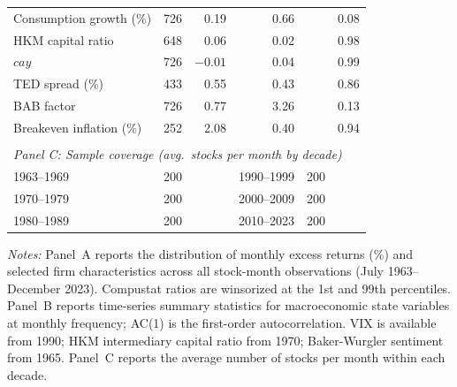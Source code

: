 \begin{table}[H]
\begin{tabular}{lrrrrrr}
Consumption growth (\%) & 726 & 0.19 & 0.66 & & & 0.08 \\
HKM capital ratio & 648 & 0.06 & 0.02 & & & 0.98 \\
$cay$ & 726 & $-0.01$ & 0.04 & & & 0.99 \\
TED spread (\%) & 433 & 0.55 & 0.43 & & & 0.86 \\
BAB factor & 726 & 0.77 & 3.26 & & & 0.13 \\
Breakeven inflation (\%) & 252 & 2.08 & 0.40 & & & 0.94 \\
\\[2pt]
\multicolumn{7}{l}{\textit{Panel C: Sample coverage (avg.\ stocks per month by decade)}} \\
1963--1969 & \multicolumn{2}{l}{200} & 1990--1999 & \multicolumn{2}{l}{200} & \\
1970--1979 & \multicolumn{2}{l}{200} & 2000--2009 & \multicolumn{2}{l}{200} & \\
1980--1989 & \multicolumn{2}{l}{200} & 2010--2023 & \multicolumn{2}{l}{200} & \\
\bottomrule
\end{tabular}
\begin{minipage}{\textwidth}
\vspace{2pt}
\scriptsize{}
\textit{Notes:} Panel~A reports the distribution of monthly excess returns (\%) and selected firm characteristics across all stock-month observations (July 1963--December 2023). Compustat ratios are winsorized at the 1st and 99th percentiles. Panel~B reports time-series summary statistics for macroeconomic state variables at monthly frequency; AC(1) is the first-order autocorrelation. VIX is available from 1990; HKM intermediary capital ratio from 1970; Baker-Wurgler sentiment from 1965. Panel~C reports the average number of stocks per month within each decade.
\end{minipage}
\end{table}